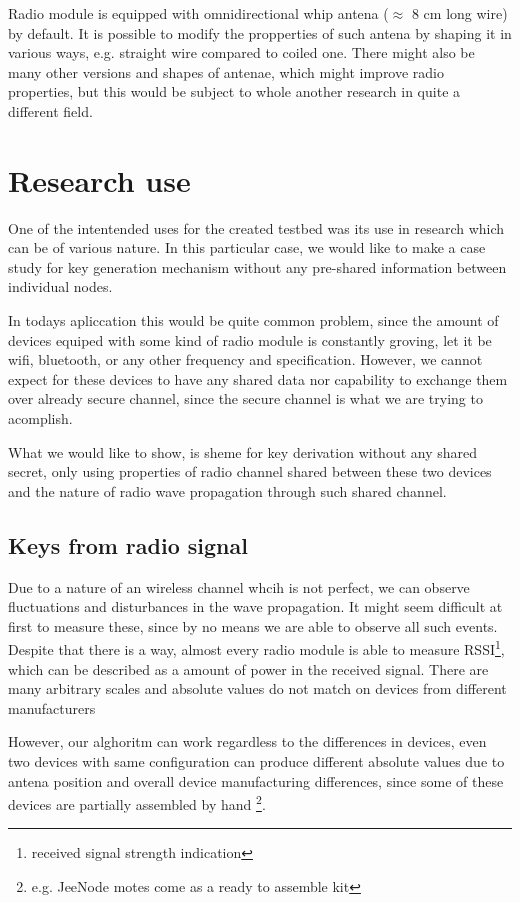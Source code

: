 \documentclass[
  digital, %
  table,   %
  nolof,     %
  nolot,     %
           oneside
]{fithesis3}
\begin{document}
  Radio module is equipped with omnidirectional whip antena ($\approx$ 8 cm long wire) by default. It is possible to modify the propperties of such antena by shaping it in various ways, e.g. straight wire compared to coiled one. There might also be many other versions and shapes of antenae, which might improve radio properties, but this would be subject to whole another research in quite a different field.

  \chapter{Research use}\label{ch:research}
  One of the intentended uses for the created testbed was its use in research which can be of various nature. In this particular case, we would like to make a case study for key generation mechanism without any pre-shared information between individual nodes.

  In todays apliccation this would be quite common problem, since the amount of devices equiped with some kind of radio module is constantly groving, let it be wifi, bluetooth, or any other frequency and specification. However, we cannot expect for these devices to have any shared data nor capability to exchange them over already secure channel, since the secure channel is what we are trying to acomplish.

  What we would like to show, is sheme for key derivation without any shared secret, only using properties of radio channel shared between these two devices and the nature of radio wave propagation through such shared channel.

  \section{Keys from radio signal}
  Due to a nature of an wireless channel whcih is not perfect, we can observe fluctuations and disturbances in the wave propagation. It might seem difficult at first to measure these, since by no means we are able to observe all such events. Despite that there is a way, almost every radio module is able to measure RSSI\footnote{received signal strength indication}, which can be described as a amount of power in the received signal. There are many arbitrary scales and absolute values do not match on devices from different manufacturers %

  However, our alghoritm can work regardless to the differences in devices, even two devices with same configuration can produce different absolute values due to antena position and overall device manufacturing differences, since some of these devices are partially assembled by hand \footnote{e.g. JeeNode motes come as a ready to assemble kit}.
\end{document}
